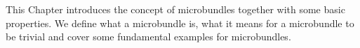 \begin{myparagraph}
    This Chapter introduces the concept of microbundles
    together with some basic properties.
    We define what a microbundle is, what it means for a microbundle to be trivial and 
    cover some fundamental examples for microbundles.
\end{myparagraph}





